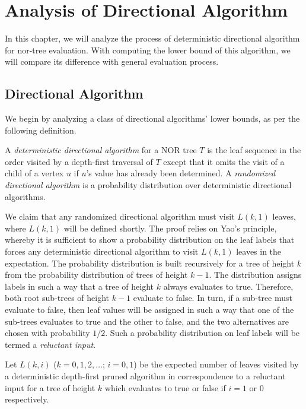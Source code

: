 \chapter{Analysis of Directional Algorithm}
In this chapter, we will analyze the process of deterministic directional algorithm for nor-tree evaluation. With computing the lower bound of this algorithm, we will compare its difference with general evaluation process.

\section{Directional Algorithm}
We begin by analyzing a class of directional algorithms' lower bounds, as per the following definition.
	\begin{definition}
	\label{def:directional}
	A {\em deterministic directional algorithm\/} 
	for a NOR tree $T$ is the leaf sequence in the order visited by
	a depth-first traversal of $T$
	except that it omits the visit of a child of a vertex $u$
	if $u$'s value has already been determined.
	A {\em randomized directional algorithm\/}
	is a probability distribution over deterministic directional algorithms.
   \end{definition}

We claim that any randomized directional algorithm must visit  
$L(k,1)$ leaves, where $L(k,1)$ will be defined shortly.
The proof relies on Yao's principle,
whereby it is sufficient to show a probability distribution on
the leaf labels that forces any deterministic directional algorithm
to visit $L(k,1)$ leaves in the expectation.
The probability distribution is built recursively for a tree of height
$k$ from the probability distribution of trees of height $k-1$.
The distribution assigns labels in such a way that a tree 
of height $k$ always evaluates to true. 
Therefore, both root sub-trees of height $k-1$ evaluate to false.
In turn, if a sub-tree must evaluate to false, then
leaf values will be assigned in such a way that
one of the sub-trees evaluates to true and the other to false,
and the two alternatives are chosen with probability $1/2$.
Such a probability distribution on leaf labels will be termed a 
{\em reluctant input\/}.

Let $L(k, i)$ ($k = 0, 1, 2, \dots$; $i = 0 ,1$) be 
the expected number of leaves visited by a deterministic
depth-first pruned algorithm in correspondence to a 
reluctant input for a tree of height $k$ which evaluates
to true  or false if $i = 1$ or $0$ respectively.

